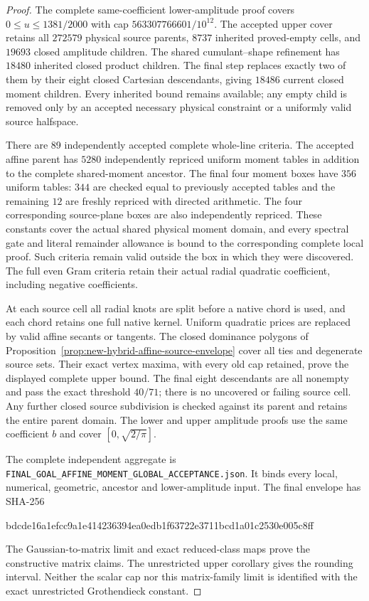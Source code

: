 \documentclass[11pt]{article}
\begin{document}
\begin{proof}
The complete same-coefficient lower-amplitude proof covers
$0\leq u\leq1381/2000$ with cap
$563307766601/10^{12}$. The accepted upper cover retains all $272579$
physical source parents, $8737$ inherited proved-empty cells, and $19693$
closed amplitude children. The shared cumulant--shape refinement has
$18480$ inherited closed product children. The final step replaces exactly
two of them by their eight closed Cartesian descendants, giving
$18486$ current closed moment children. Every inherited bound remains
available; any empty child is
removed only by an accepted necessary physical constraint or a uniformly
valid source halfspace.

There are 89 independently accepted complete whole-line criteria.
The accepted affine parent has $5280$ independently repriced uniform
moment tables in addition to the complete shared-moment ancestor.
The final four moment boxes have $356$ uniform tables: $344$ are checked
equal to previously accepted tables and the remaining $12$ are freshly
repriced with directed arithmetic. The four corresponding source-plane
boxes are also independently repriced. These constants cover the actual shared physical
moment domain, and every spectral gate and literal remainder allowance
is bound to the corresponding complete local proof. Such criteria remain
valid outside the box in which they were discovered. The full even Gram
criteria retain their actual radial quadratic coefficient, including
negative coefficients.

At each source cell all radial knots are split before a native chord is
used, and each chord retains one full native kernel. Uniform quadratic
prices are replaced by valid affine secants or tangents. The closed
dominance polygons of Proposition~\ref{prop:new-hybrid-affine-source-envelope}
cover all ties and degenerate source sets. Their exact vertex maxima,
with every old cap retained, prove the displayed complete upper bound.
The final eight descendants are all nonempty and pass the exact threshold
$40/71$; there is no uncovered or failing source cell.
Any further closed source subdivision is checked against its parent and
retains the entire parent domain. The lower and upper amplitude proofs
use the same coefficient $b$ and cover $[0,\sqrt{2/\pi}]$.

The complete independent aggregate is
\texttt{FINAL\_GOAL\_AFFINE\_MOMENT\_GLOBAL\_ACCEPTANCE.json}. It binds every local, numerical, geometric,
ancestor and lower-amplitude input. The final envelope has SHA-256
\begin{center}\small\ttfamily
bdcde16a1efcc9a1e414236394ea0edb1f63722e3711bcd1a01c2530e005c8ff
\end{center}
The Gaussian-to-matrix limit and exact reduced-class maps prove the
constructive matrix claims. The unrestricted upper corollary gives the
rounding interval. Neither the scalar cap nor this matrix-family limit
is identified with the exact unrestricted Grothendieck constant.
\end{proof}
\end{document}
